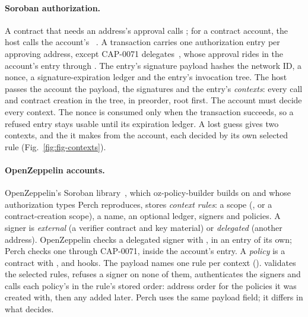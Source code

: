 \paragraph{Soroban authorization.} A contract that needs an address's approval
calls ; for a contract account, the host calls the account's
~\cite{cap-0046-11,stellar-custom-account}. A transaction
carries one authorization entry per approving address, except CAP-0071
delegates~\cite{cap-0071}, whose approval rides in the account's entry through
. The entry's signature payload hashes the network ID, a
nonce, a signature-expiration ledger and the entry's invocation tree. The host
passes the account the payload, the signatures and the entry's \emph{contexts}:
every call and contract creation in the tree, in preorder, root first. The
account must decide every context. The nonce is consumed only when the
transaction succeeds, so a refused entry stays usable until its expiration
ledger. A lost guess gives two contexts,  and the
 it makes from the account, each decided by its own selected
rule (Fig.~\ref{fig:fig-contexts}).

\paragraph{OpenZeppelin accounts.} OpenZeppelin's Soroban
library~\cite{oz-stellar-accounts}, which oz-policy-builder builds on and whose
authorization types Perch reproduces, stores \emph{context rules}: a scope
(,  or a contract-creation scope), a name, an
optional  ledger, signers and policies. A signer is
\emph{external} (a verifier contract and key material) or \emph{delegated}
(another address). OpenZeppelin  checks a delegated signer with
, in an entry of its own; Perch checks one through
CAP-0071, inside the account's entry. A \emph{policy} is a contract with
,  and  hooks. The payload names one
rule per context (). 
validates the selected rules, refuses a signer on none of them, authenticates the
signers and calls each policy's  in the rule's stored order: address
order for the policies it was created with, then any added later. Perch uses the
same payload field; it differs in what decides.
